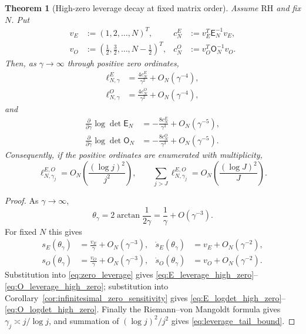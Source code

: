\documentclass[11pt]{amsart}
\numberwithin{equation}{section}
\theoremstyle{plain}
\newtheorem{theorem}{Theorem}[section]
\theoremstyle{definition}
\theoremstyle{remark}
\newcommand{\RH}{\mathrm{RH}}
\newcommand{\E}{\mathsf E}
\newcommand{\Omat}{\mathsf O}
\begin{document}
\begin{theorem}[High-zero leverage decay at fixed matrix order]
\label{thm:high_zero_leverage_decay}
Assume $\RH$ and fix $N$.  Put
\begin{align}
v_E&:=(1,2,\ldots,N)^T,
&c_N^E&:=v_E^T\E_N^{-1}v_E,
\label{eq:cNE_definition}\\
v_O&:=(\tfrac12,\tfrac32,\ldots,N-\tfrac12)^T,
&c_N^O&:=v_O^T\Omat_N^{-1}v_O.
\label{eq:cNO_definition}
\end{align}
Then, as $\gamma\to\infty$ through positive zero ordinates,
\begin{align}
\ell_{N,\gamma}^E
&=\frac{4c_N^E}{\gamma^2}+O_N(\gamma^{-4}),
\label{eq:E_leverage_high_zero}\\
\ell_{N,\gamma}^O
&=\frac{4c_N^O}{\gamma^2}+O_N(\gamma^{-4}),
\label{eq:O_leverage_high_zero}
\end{align}
and
\begin{align}
\frac{\partial}{\partial\gamma}\log\det\E_N
&=-\frac{8c_N^E}{\gamma^3}+O_N(\gamma^{-5}),
\label{eq:E_logdet_high_zero}\\
\frac{\partial}{\partial\gamma}\log\det\Omat_N
&=-\frac{8c_N^O}{\gamma^3}+O_N(\gamma^{-5}).
\label{eq:O_logdet_high_zero}
\end{align}
Consequently, if the positive ordinates are enumerated with multiplicity,
\begin{equation}
\ell_{N,\gamma_j}^{E,O}
=O_N\left(\frac{(\log j)^2}{j^2}\right),
\qquad
\sum_{j>J}\ell_{N,\gamma_j}^{E,O}
=O_N\left(\frac{(\log J)^2}{J}\right).
\label{eq:leverage_tail_bound}
\end{equation}
\end{theorem}

\begin{proof}
As $\gamma\to\infty$,
\begin{equation}
\theta_\gamma
=2\arctan\frac1{2\gamma}
=\frac1\gamma+O(\gamma^{-3}).
\end{equation}
For fixed $N$ this gives
\begin{align}
s_E(\theta_\gamma)&=\frac{v_E}{\gamma}+O_N(\gamma^{-3}),
&\dot s_E(\theta_\gamma)&=v_E+O_N(\gamma^{-2}),\\
s_O(\theta_\gamma)&=\frac{v_O}{\gamma}+O_N(\gamma^{-3}),
&\dot s_O(\theta_\gamma)&=v_O+O_N(\gamma^{-2}).
\end{align}
Substitution into \eqref{eq:zero_leverage} gives \eqref{eq:E_leverage_high_zero}--\eqref{eq:O_leverage_high_zero}; substitution into Corollary~\ref{cor:infinitesimal_zero_sensitivity} gives \eqref{eq:E_logdet_high_zero}--\eqref{eq:O_logdet_high_zero}.  Finally the Riemann--von Mangoldt formula gives $\gamma_j\asymp j/\log j$, and summation of $(\log j)^2/j^2$ gives \eqref{eq:leverage_tail_bound}.
\end{proof}
\end{document}
